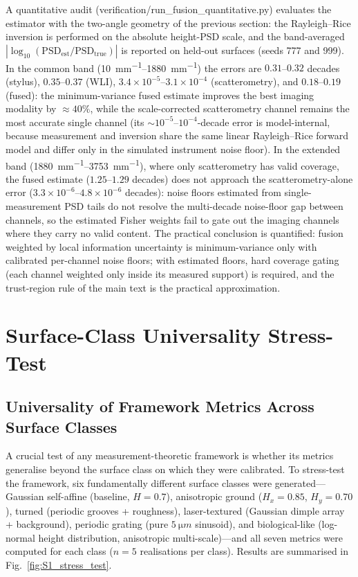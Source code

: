 \documentclass[review,12pt]{elsarticle}
\begin{document}
A quantitative audit (verification/run\_fusion\_quantitative.py) evaluates the estimator with the two-angle geometry of the previous section: the Rayleigh--Rice inversion is performed on the absolute height-PSD scale, and the band-averaged $|\log_{10}(\mathrm{PSD}_\mathrm{est}/\mathrm{PSD}_\mathrm{true})|$ is reported on held-out surfaces (seeds 777 and 999). In the common band (\SIrange{10}{1880}{mm^{-1}}) the errors are $0.31$--$0.32$ decades (stylus), $0.35$--$0.37$ (WLI), $3.4\times10^{-5}$--$3.1\times10^{-4}$ (scatterometry), and $0.18$--$0.19$ (fused): the minimum-variance fused estimate improves the best imaging modality by $\approx40\%$, while the scale-corrected scatterometry channel remains the most accurate single channel (its $\sim10^{-5}$--$10^{-4}$-decade error is model-internal, because measurement and inversion share the same linear Rayleigh--Rice forward model and differ only in the simulated instrument noise floor). In the extended band (\SIrange{1880}{3753}{mm^{-1}}), where only scatterometry has valid coverage, the fused estimate ($1.25$--$1.29$ decades) does not approach the scatterometry-alone error ($3.3\times10^{-6}$--$4.8\times10^{-6}$ decades): noise floors estimated from single-measurement PSD tails do not resolve the multi-decade noise-floor gap between channels, so the estimated Fisher weights fail to gate out the imaging channels where they carry no valid content. The practical conclusion is quantified: fusion weighted by local information uncertainty is minimum-variance only with calibrated per-channel noise floors; with estimated floors, hard coverage gating (each channel weighted only inside its measured support) is required, and the trust-region rule of the main text is the practical approximation.


\section{Surface-Class Universality Stress-Test}
\subsection{Universality of Framework Metrics Across Surface Classes}
\label{sec:universality}

A crucial test of any measurement-theoretic framework is whether its metrics generalise beyond the surface class on which they were calibrated. To stress-test the framework, six fundamentally different surface classes were generated---Gaussian self-affine (baseline, $H=0.7$), anisotropic ground ($H_x=0.85$, $H_y=0.70$), turned (periodic grooves + roughness), laser-textured (Gaussian dimple array + background), periodic grating (pure $\SI{5}{\micro m}$ sinusoid), and biological-like (log-normal height distribution, anisotropic multi-scale)---and all seven metrics were computed for each class ($n=5$ realisations per class). Results are summarised in Fig.~\ref{fig:S1_stress_test}.
\end{document}
